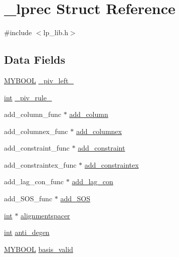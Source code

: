 \hypertarget{struct__lprec}{}\section{\+\_\+lprec Struct Reference}
\label{struct__lprec}


{\ttfamily \#include $<$lp\+\_\+lib.\+h$>$}

\subsection*{Data Fields}
\begin{DoxyCompactItemize}
\item 
\hyperlink{lp__lib_8h_aad848328fb3018217ac9f01d97b6bd88}{M\+Y\+B\+O\+OL} \hyperlink{struct__lprec_adb309f1d47a67306a8692d8814d7f8a7}{\+\_\+piv\+\_\+left\+\_\+}
\item 
\hyperlink{lp__lib_8h_adeb9ec6400320e4923ac9d836d509ddb}{int} \hyperlink{struct__lprec_ad8ad8e5228b248c61b268705f09d9d2e}{\+\_\+piv\+\_\+rule\+\_\+}
\item 
add\+\_\+column\+\_\+func $\ast$ \hyperlink{struct__lprec_ac6637e9f03f92b6e79917fed10b52de7}{add\+\_\+column}
\item 
add\+\_\+columnex\+\_\+func $\ast$ \hyperlink{struct__lprec_a1e96865b6585be05bac1b776e3adff3c}{add\+\_\+columnex}
\item 
add\+\_\+constraint\+\_\+func $\ast$ \hyperlink{struct__lprec_adf3981d22f386958de7bd476f5c99086}{add\+\_\+constraint}
\item 
add\+\_\+constraintex\+\_\+func $\ast$ \hyperlink{struct__lprec_a9c36296925355fbdf5aa9e0cdd6f22a7}{add\+\_\+constraintex}
\item 
add\+\_\+lag\+\_\+con\+\_\+func $\ast$ \hyperlink{struct__lprec_aa39b89084786e6283c362ebe698cad28}{add\+\_\+lag\+\_\+con}
\item 
add\+\_\+\+S\+O\+S\+\_\+func $\ast$ \hyperlink{struct__lprec_a8e9e43b00d716797f046bb693ee57c58}{add\+\_\+\+S\+OS}
\item 
\hyperlink{lp__lib_8h_adeb9ec6400320e4923ac9d836d509ddb}{int} $\ast$ \hyperlink{struct__lprec_a9c370f6dee1fc3e271bd0bdd43e202f2}{alignmentspacer}
\item 
\hyperlink{lp__lib_8h_adeb9ec6400320e4923ac9d836d509ddb}{int} \hyperlink{struct__lprec_a69f5a0a39d2b42e194c8cd1c33335f42}{anti\+\_\+degen}
\item 
\hyperlink{lp__lib_8h_aad848328fb3018217ac9f01d97b6bd88}{M\+Y\+B\+O\+OL} \hyperlink{struct__lprec_a2d397a1a2f76096a541f61b0c7f7873e}{basis\+\_\+valid}

\end{DoxyCompactItemize}
